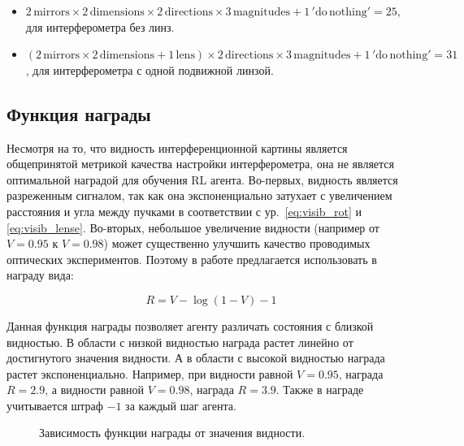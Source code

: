 \begin{itemize}
    \item $2\,\mathrm{mirrors} \times 2\,\mathrm{dimensions} \times 2\,\mathrm{directions} \times 3\,\mathrm{magnitudes} + 1\,'\mathrm{do\, nothing}' = 25$, для интерферометра без линз. 
    \item  $(2\,\mathrm{mirrors} \times 2\,\mathrm{dimensions} + 1\,\mathrm{lens}) \times 2\,\mathrm{directions} \times 3\,\mathrm{magnitudes} + 1\,'\mathrm{do\, nothing}' = 31$, для интерферометра с одной подвижной линзой.
\end{itemize}

\subsection{Функция награды}

Несмотря на то, что видность интерференционной картины является общепринятой метрикой качества настройки интерферометра, она не является оптимальной наградой для обучения RL агента. Во-первых, видность является разреженным сигналом, так как она экспоненциально затухает с увеличением расстояния и угла между пучками в соответствии с ур.~\eqref{eq:visib_rot} и \eqref{eq:visib_lense}. Во-вторых, небольшое увеличение видности (например от $V = 0.95$ к $V = 0.98$) может существенно улучшить качество проводимых оптических экспериментов. Поэтому в работе предлагается использовать в награду вида:

\begin{equation}
    R = V - \log(1-V) - 1
\label{eq:dqn_reward}
\end{equation}

Данная функция награды позволяет агенту различать состояния с близкой видностью. В области с низкой видностью награда растет линейно от достигнутого значения видности. А в области с высокой видностью награда растет экспоненциально. Например, при видности равной $V = 0.95$, награда $R = 2.9$, а видности равной $V = 0.98$, награда $R = 3.9$. Также в награде учитывается штраф $-1$ за каждый шаг агента. 

\begin{figure}[ht]
\caption{Зависимость функции награды от значения видности.}
\label{fig:reward_visib}
\end{figure}

